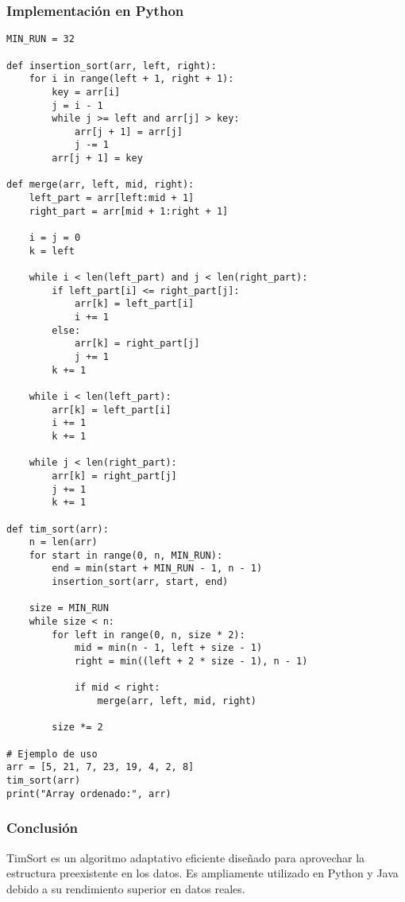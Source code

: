 \documentclass[11pt,openany]{book}
\begin{document}
\subsubsection{Implementación en Python}
\lstset{language=Python}
\begin{lstlisting}
MIN_RUN = 32

def insertion_sort(arr, left, right):
    for i in range(left + 1, right + 1):
        key = arr[i]
        j = i - 1
        while j >= left and arr[j] > key:
            arr[j + 1] = arr[j]
            j -= 1
        arr[j + 1] = key

def merge(arr, left, mid, right):
    left_part = arr[left:mid + 1]
    right_part = arr[mid + 1:right + 1]

    i = j = 0
    k = left

    while i < len(left_part) and j < len(right_part):
        if left_part[i] <= right_part[j]:
            arr[k] = left_part[i]
            i += 1
        else:
            arr[k] = right_part[j]
            j += 1
        k += 1

    while i < len(left_part):
        arr[k] = left_part[i]
        i += 1
        k += 1

    while j < len(right_part):
        arr[k] = right_part[j]
        j += 1
        k += 1

def tim_sort(arr):
    n = len(arr)
    for start in range(0, n, MIN_RUN):
        end = min(start + MIN_RUN - 1, n - 1)
        insertion_sort(arr, start, end)

    size = MIN_RUN
    while size < n:
        for left in range(0, n, size * 2):
            mid = min(n - 1, left + size - 1)
            right = min((left + 2 * size - 1), n - 1)

            if mid < right:
                merge(arr, left, mid, right)

        size *= 2

# Ejemplo de uso
arr = [5, 21, 7, 23, 19, 4, 2, 8]
tim_sort(arr)
print("Array ordenado:", arr)
\end{lstlisting}

\subsubsection{Conclusión}
TimSort es un algoritmo adaptativo eficiente diseñado para aprovechar la estructura preexistente en los datos. Es ampliamente utilizado en Python y Java debido a su rendimiento superior en datos reales.
\end{document}
